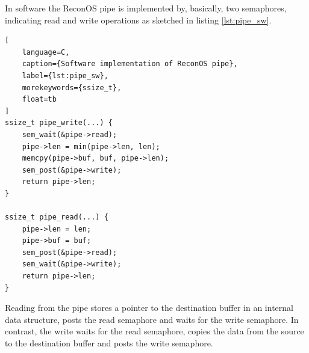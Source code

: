 In software the ReconOS pipe is implemented by, basically, two semaphores,
indicating read and write operations as sketched in listing \ref{lst:pipe_sw}.
\begin{lstlisting}[
	language=C,
	caption={Software implementation of ReconOS pipe},
	label={lst:pipe_sw},
	morekeywords={ssize_t},
	float=tb
]
ssize_t pipe_write(...) {
	sem_wait(&pipe->read);
	pipe->len = min(pipe->len, len);
	memcpy(pipe->buf, buf, pipe->len);
	sem_post(&pipe->write);
	return pipe->len;
}

ssize_t pipe_read(...) {
	pipe->len = len;
	pipe->buf = buf;
	sem_post(&pipe->read);
	sem_wait(&pipe->write);
	return pipe->len;
}
\end{lstlisting}
Reading from the pipe stores a pointer to the destination buffer in an
internal data structure, posts the read semaphore and waits for the write
semaphore. In contrast, the write waits for the read semaphore, copies the
data from the source to the destination buffer and posts the write semaphore.

